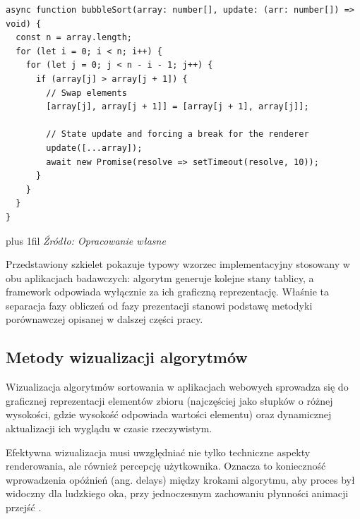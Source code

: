 \documentclass[12pt,openright,twoside]{report}
\newcommand{\source}[1]{{\par\vspace{5pt}\noindent\leftskip=0pt \rightskip=0pt \parfillskip=0pt plus 1fil \footnotesize\textit{Źródło: #1}\par}}
\begin{document}
\begin{lstlisting}[language=tsx, caption={Szkielet asynchronicznego algorytmu sortowania (ang. Bubble Sort) przygotowany pod wizualizację.}, label={lst:algo-skeleton}]
async function bubbleSort(array: number[], update: (arr: number[]) => void) {
  const n = array.length;
  for (let i = 0; i < n; i++) {
    for (let j = 0; j < n - i - 1; j++) {
      if (array[j] > array[j + 1]) {
        // Swap elements
        [array[j], array[j + 1]] = [array[j + 1], array[j]];

        // State update and forcing a break for the renderer
        update([...array]);
        await new Promise(resolve => setTimeout(resolve, 10));
      }
    }
  }
}
\end{lstlisting}
\source{Opracowanie własne}

Przedstawiony szkielet pokazuje typowy wzorzec implementacyjny stosowany w obu aplikacjach badawczych: algorytm generuje kolejne stany tablicy, a framework odpowiada wyłącznie za ich graficzną reprezentację. Właśnie ta separacja fazy obliczeń od fazy prezentacji stanowi podstawę metodyki porównawczej opisanej w dalszej części pracy.

\subsection{Metody wizualizacji algorytmów}
Wizualizacja algorytmów sortowania w aplikacjach webowych sprowadza się do graficznej reprezentacji elementów zbioru (najczęściej jako słupków o różnej wysokości, gdzie wysokość odpowiada wartości elementu) oraz dynamicznej aktualizacji ich wyglądu w czasie rzeczywistym.

Efektywna wizualizacja musi uwzględniać nie tylko techniczne aspekty renderowania, ale również percepcję użytkownika. Oznacza to konieczność wprowadzenia opóźnień (ang. delays) między krokami algorytmu, aby proces był widoczny dla ludzkiego oka, przy jednoczesnym zachowaniu płynności animacji przejść \cite{Nielsen_Usability}.
\end{document}

